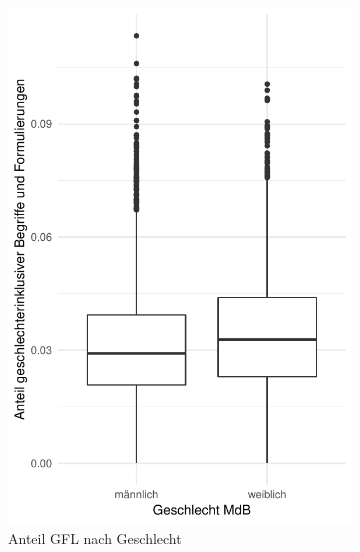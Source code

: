 \documentclass[12pt, 
    twoside=false, 
    bibliography=totoc, 
    numbers=endperiod, 
    headings=normal, 
    toc=chapterentrydotfill
    ]{scrbook}
\begin{document}
\begin{figure}[H]
    \centering
    \begin{subfigure}{.5\textwidth}
      \centering
      \includegraphics[width=.9\linewidth]{images/boxplot_gfl.pdf}
      \caption{Anteil GFL nach Geschlecht}
      \label{fig:boxplot_gfl_geschlecht}
    \end{subfigure}%
    \begin{subfigure}{.5\textwidth}
      \centering

\end{subfigure}
\end{figure}
\end{document}
